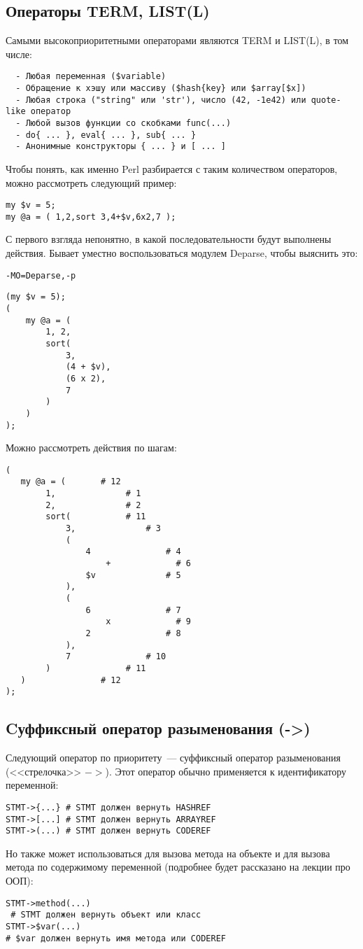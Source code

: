 \subsection{Операторы TERM, LIST(L)}
Самыми высокоприоритетными операторами являются TERM и LIST(L), в том числе:
\begin{verbatim}
  - Любая переменная ($variable)
  - Обращение к хэшу или массиву ($hash{key} или $array[$x])
  - Любая строка ("string" или 'str'), число (42, -1e42) или quote-like оператор
  - Любой вызов функции со скобками func(...)
  - do{ ... }, eval{ ... }, sub{ ... }
  - Анонимные конструкторы { ... } и [ ... ]
\end{verbatim}
Чтобы понять, как именно Perl разбирается с таким количеством операторов, можно рассмотреть следующий пример:
\begin{verbatim}
my $v = 5;
my @a = ( 1,2,sort 3,4+$v,6x2,7 );
\end{verbatim}
С первого взгляда непонятно, в какой последовательности будут выполнены действия. Бывает уместно воспользоваться модулем Deparse, чтобы выяснить это:
\begin{verbatim}
-MO=Deparse,-p
\end{verbatim}
\begin{verbatim}
(my $v = 5);
(
    my @a = (
        1, 2,
        sort(
            3,
            (4 + $v),
            (6 x 2),
            7
        )
    )
);

\end{verbatim}
Можно рассмотреть действия по шагам:
\begin{verbatim}
(
   my @a = (       # 12
        1,              # 1
        2,              # 2
        sort(           # 11
            3,              # 3
            (
                4               # 4
                    +             # 6
                $v              # 5
            ),
            (
                6               # 7
                    x             # 9
                2               # 8
            ),
            7               # 10
        )               # 11
   )               # 12
);
\end{verbatim}


\subsection{Cуффиксный оператор разыменования (->)}
Следующий оператор по приоритету~--- суффиксный оператор разыменования (<<стрелочка>> $->$). Этот оператор обычно применяется к идентификатору переменной:
\begin{verbatim}
STMT->{...} # STMT должен вернуть HASHREF
STMT->[...] # STMT должен вернуть ARRAYREF
STMT->(...) # STMT должен вернуть CODEREF
\end{verbatim}
Но также может использоваться для вызова метода на объекте и для вызова метода  по содержимому переменной (подробнее будет рассказано на лекции про ООП):
\begin{verbatim}
STMT->method(...)
 # STMT должен вернуть объект или класс
STMT->$var(...)
# $var должен вернуть имя метода или CODEREF
\end{verbatim}


